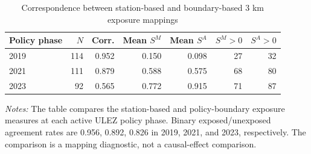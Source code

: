 \begin{table}[!htbp]
\centering
\caption{Correspondence between station-based and boundary-based 3 km exposure mappings}
\label{tab:ulez_boundary_mapping_correspondence}
\small
\begin{threeparttable}
\begin{tabular}{lrrrrrr}
\toprule
Policy phase & $N$ & Corr. & Mean $S^M$ & Mean $S^A$ & $S^M>0$ & $S^A>0$ \\
\midrule
2019 & 114 & 0.952 & 0.150 & 0.098 & 27 & 32 \\
2021 & 111 & 0.879 & 0.588 & 0.575 & 68 & 80 \\
2023 & 92 & 0.565 & 0.772 & 0.915 & 71 & 87 \\
\bottomrule
\end{tabular}
\begin{tablenotes}
\footnotesize
\item \emph{Notes:} The table compares the station-based and policy-boundary exposure measures at each active ULEZ policy phase. Binary exposed/unexposed agreement rates are 0.956, 0.892, 0.826 in 2019, 2021, and 2023, respectively. The comparison is a mapping diagnostic, not a causal-effect comparison.
\end{tablenotes}
\end{threeparttable}
\end{table}
